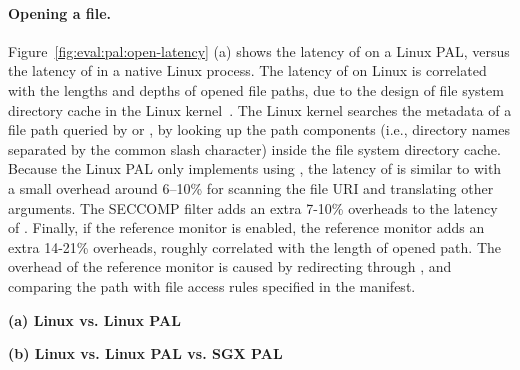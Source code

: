 \paragraph{Opening a file.}
Figure~\ref{fig:eval:pal:open-latency} (a) shows the latency of  on a Linux PAL, versus the latency of  \linuxapis{} in a native Linux process.
The latency of  \linuxapis{} on Linux is correlated with
the lengths and depths of opened file paths,
due to the design of file system directory cache
in the Linux kernel~\cite{tsai15dcache}.
The Linux kernel searches the metadata of a file path queried by  or , by looking up the path components (i.e., directory names separated by the common slash character)
inside the file system directory cache.
Because the Linux PAL only implements  using , the latency of  is similar to  with a small overhead around 6--10\% for
scanning the file URI and translating other \linuxapi{} arguments.
The SECCOMP filter adds an extra 7-10\% overheads to the latency of . Finally, if the reference monitor is enabled, the reference monitor adds an extra 14-21\% overheads, roughly correlated with the length of opened path.
The overhead of the reference monitor
is caused by redirecting  \linuxapis{} through , and comparing the path with file access rules specified in the manifest.  




\begin{figure*}[t!]
\centering
\footnotesize
{}
\parbox{0.49\textwidth}{\centering\bf (a) Linux vs. Linux PAL}
\parbox{0.49\textwidth}{\centering\bf (b) Linux vs. Linux PAL vs. SGX PAL}
\caption{Latency of  on the Linux PAL  and SGX PAL, versus  on Linux.
Lower is better.
Figure (a) compares  on the Linux PAL,
with and without a SECCOMP filter ({\bf +SC})
and reference monitor ({\bf +RM}), against  on Linux. Figure (b) compares  on a SGX PAL,
with and without integrity checks ({\bf +CHK}),
against the Linux PAL and  on Linux.}
\label{fig:eval:pal:open-latency}
\end{figure*}


